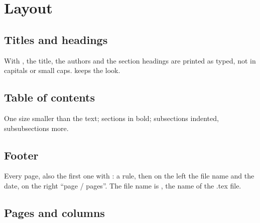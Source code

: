 \documentclass[11pt]{amsart}         %
\begin{document}
\hbTimeStamp \quad \hbTimeStampDraft




\section{Layout}

\subsection{Titles and headings}

With , the title, the authors and the section headings are printed as typed,
not in capitals or small caps.
 keeps the  look.


\subsection{Table of contents}

One size smaller than the text; sections in bold; subsections indented, subsubsections more.

\begin{texcode}
\setcounter{tocdepth}{2}   %
\end{texcode}


\subsection{Footer}

Every page, also the first one with :
a rule, then on the left the file name and the date, on the right ``page / pages''.
The file name is , the name of the .tex file.


\subsection{Pages and columns}

\end{document}
